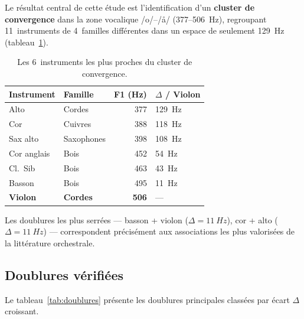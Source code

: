 \documentclass[11pt,a4paper]{article}
\begin{document}
Le résultat central de cette étude est l'identification d'un
\textbf{cluster de convergence} dans la zone vocalique /o/--/\r{a}/
(377--\SI{506}{Hz}), regroupant 11~instruments de 4~familles
différentes dans un espace de seulement \SI{129}{Hz}
(tableau~\ref{tab:cluster}).

\begin{table}[ht]
\centering
\caption{Les 6~instruments les plus proches du cluster de convergence.}
\label{tab:cluster}
\begin{tabular}{llrl}
\toprule
Instrument & Famille & F1 (Hz) & $\Delta$ / Violon \\
\midrule
Alto       & Cordes  & 377 & \SI{129}{Hz} \\
Cor        & Cuivres & 388 & \SI{118}{Hz} \\
Sax alto   & Saxophones & 398 & \SI{108}{Hz} \\
Cor anglais & Bois   & 452 & \SI{54}{Hz} \\
Cl.~Sib    & Bois   & 463 & \SI{43}{Hz} \\
Basson     & Bois   & 495 & \SI{11}{Hz} \\
\textbf{Violon} & \textbf{Cordes} & \textbf{506} & --- \\
\bottomrule
\end{tabular}
\end{table}

Les doublures les plus serrées --- basson + violon ($\Delta =
\SI{11}{Hz}$), cor + alto ($\Delta = \SI{11}{Hz}$) --- correspondent
précisément aux associations les plus valorisées de la littérature
orchestrale.

\subsection{Doublures vérifiées}

Le tableau~\ref{tab:doublures} présente les doublures principales
classées par écart $\Delta$ croissant.
\end{document}
